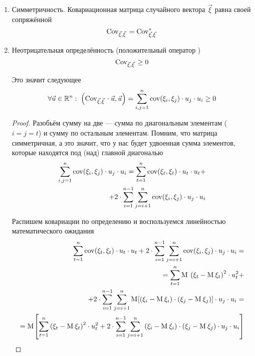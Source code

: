 \begin{enumerate}
    \item Симметричность. Ковариационная матрица случайного вектора $\vec{\xi}$
        равна своей сопряжённой
        $$\mathrm{Cov}_{\vec{\xi}, \vec{\xi}}\, = \mathrm{Cov}_{\vec{\xi}, \vec{\xi}}^*\,$$
    \item Неотрицательная определённость
        (положительный оператор \cite[с.~139]{IlinPoznyarLA})
        $$\mathrm{Cov}_{\vec{\xi}, \vec{\xi}}\, \ge 0$$

        Это значит следующее
        $$\forall \vec{u} \in \mathbb{R}^n:\;
            \left( \mathrm{Cov}_{\vec{\xi}, \vec{\xi}}\, \cdot \vec{u}, \vec{u} \right)
            = \sum_{i,j=1}^{n} \mathrm{cov}\!\left( \xi_i, \xi_j \right) \cdot u_j \cdot u_i
            \ge 0$$

        \begin{proof}
            Разобьём сумму на две --- сумма по диагональным элементам ($i=j=t$)
            и сумму по остальным элементам. Помним, что матрица симметричная,
            а это значит, что у нас будет удвоенная сумма элементов, которые
            находятся под (над) главной диагональю
            \begin{align*}
                \sum_{i,j=1}^{n} \mathrm{cov}\!\left( \xi_i, \xi_j \right) \cdot u_j \cdot u_i
                    = \sum_{t=1}^{n} \mathrm{cov}\!\left( \xi_t, \xi_t \right) \cdot u_t \cdot u_t + \\
                        + 2 \cdot \sum_{i=1}^{n-1} \sum_{j=i+1}^{n}
                            \mathrm{cov}\!\left( \xi_i, \xi_j \right) \cdot u_j \cdot u_i
            \end{align*}

            Распишем ковариации по определению и воспользуемся линейностью
            математического ожидания
            \begin{align*}
                \sum_{t=1}^{n} \mathrm{cov}\!\left( \xi_t, \xi_t \right) \cdot u_t \cdot u_t
                    + 2 \cdot \sum_{i=1}^{n-1} \sum_{j=i+1}^{n}
                        \mathrm{cov}\!\left( \xi_i, \xi_j \right) \cdot u_j \cdot u_i = \\
                    = \sum_{t=1}^{n}
                            \mathrm{M}_{}\,\left( \xi_t - \mathrm{M}_{}\,\xi_t \right)^2
                            \cdot u_t^2 + \\
                        + 2 \cdot \sum_{i=1}^{n-1} \sum_{j=i+1}^{n}
                            \mathrm{M}_{}\!\left[ \left( \xi_i - \mathrm{M}_{}\,\xi_i \right)
                                \cdot \left( \xi_j - \mathrm{M}_{}\,\xi_j \right) \right]
                            \cdot u_j \cdot u_i = \\
                    = \mathrm{M}_{}\!\left[ \sum_{t=1}^{n}
                            \left( \xi_t - \mathrm{M}_{}\,\xi_t \right)^2 \cdot u_t^2
                        + 2 \cdot \sum_{i=1}^{n-1} \sum_{j=i+1}^{n}
                            \left( \xi_i - \mathrm{M}_{}\,\xi_i \right)
                                \cdot \left( \xi_j - \mathrm{M}_{}\,\xi_j \right)
                            \cdot u_j \cdot u_i \right]
            \end{align*}


\end{proof}
\end{enumerate}
